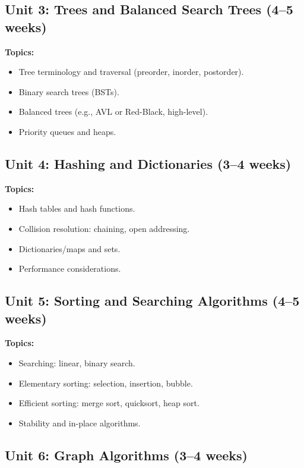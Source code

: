 \documentclass[12pt,oneside]{book}
\begin{document}
\subsection{Unit 3: Trees and Balanced Search Trees (4--5 weeks)}

\textbf{Topics:}
\begin{itemize}
    \item Tree terminology and traversal (preorder, inorder, postorder).
    \item Binary search trees (BSTs).
    \item Balanced trees (e.g., AVL or Red-Black, high-level).
    \item Priority queues and heaps.
\end{itemize}

\subsection{Unit 4: Hashing and Dictionaries (3--4 weeks)}

\textbf{Topics:}
\begin{itemize}
    \item Hash tables and hash functions.
    \item Collision resolution: chaining, open addressing.
    \item Dictionaries/maps and sets.
    \item Performance considerations.
\end{itemize}

\subsection{Unit 5: Sorting and Searching Algorithms (4--5 weeks)}

\textbf{Topics:}
\begin{itemize}
    \item Searching: linear, binary search.
    \item Elementary sorting: selection, insertion, bubble.
    \item Efficient sorting: merge sort, quicksort, heap sort.
    \item Stability and in-place algorithms.
\end{itemize}

\subsection{Unit 6: Graph Algorithms (3--4 weeks)}
\end{document}
